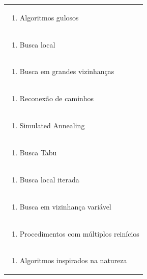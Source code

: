 \documentclass[11pt]{article}
\begin{document}
\begin{center}
\begin{longtable}{|p{4cm}|p{4cm}|p{4cm}|p{4cm}|}
\multicolumn{4}{|p{\dimexpr 16cm + 6\tabcolsep\relax}|}{\begin{enumerate}[start=2]\item Algoritmos gulosos\end{enumerate}}\\
\multicolumn{4}{|p{\dimexpr 16cm + 6\tabcolsep\relax}|}{\begin{enumerate}[start=3]\item Busca local\end{enumerate}}\\
\multicolumn{4}{|p{\dimexpr 16cm + 6\tabcolsep\relax}|}{\begin{enumerate}[start=4]\item Busca em grandes vizinhanças\end{enumerate}}\\
\multicolumn{4}{|p{\dimexpr 16cm + 6\tabcolsep\relax}|}{\begin{enumerate}[start=5]\item Reconexão de caminhos\end{enumerate}}\\
\multicolumn{4}{|p{\dimexpr 16cm + 6\tabcolsep\relax}|}{\begin{enumerate}[start=6]\item Simulated Annealing\end{enumerate}}\\
\multicolumn{4}{|p{\dimexpr 16cm + 6\tabcolsep\relax}|}{\begin{enumerate}[start=7]\item Busca Tabu\end{enumerate}}\\
\multicolumn{4}{|p{\dimexpr 16cm + 6\tabcolsep\relax}|}{\begin{enumerate}[start=8]\item Busca local iterada\end{enumerate}}\\
\multicolumn{4}{|p{\dimexpr 16cm + 6\tabcolsep\relax}|}{\begin{enumerate}[start=9]\item Busca em vizinhança variável\end{enumerate}}\\
\multicolumn{4}{|p{\dimexpr 16cm + 6\tabcolsep\relax}|}{\begin{enumerate}[start=10]\item Procedimentos com múltiplos reinícios\end{enumerate}}\\
\multicolumn{4}{|p{\dimexpr 16cm + 6\tabcolsep\relax}|}{\begin{enumerate}[start=11]\item Algoritmos inspirados na natureza\end{enumerate}}\\

\end{longtable}
\end{center}
\end{document}
